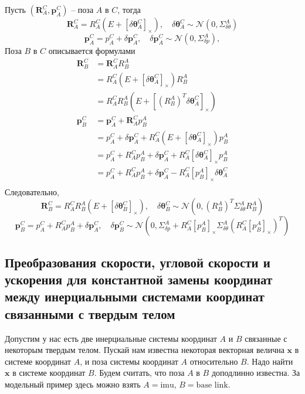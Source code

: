 \documentclass[12pt]{article}
\begin{document}
Пусть $(\pmb{R}_A^C, \pmb{p}_A^C)$ -- поза $A$ в $C$, тогда
$$
    \pmb{R}_A^C=R_A^C(E+[\delta\pmb{\theta}_A^C]_\times),
    \quad
    \delta\pmb{\theta}_A^C \sim\mathcal{N}(0, \Sigma_{\delta\theta}^A)
$$
$$
    \pmb{p}_A^C=p_A^C+\delta \pmb{p}_A^C,
    \quad
    \delta\pmb{p}_A^C\sim\mathcal{N}(0, \Sigma_{\delta p}^A),
$$
Поза $B$ в $C$ описывается формулами
$$
    \begin{aligned}
        \pmb{R}_B^C
         & =\pmb{R}_A^C R_B^A                                              \\
         & =R_A^C(E+[\delta\pmb{\theta}_A^C]_\times) R_B^A                 \\
         & =R_A^C R_B^A(E+[(R_B^A)^T\delta\pmb{\theta}_A^C]_\times)        \\
        \pmb{p}_B^C
         & =\pmb{p}_A^C + \pmb{R}_A^C p_B^A                                \\
         & =p_A^C + \delta \pmb{p}_A^C
        + R_A^C(E+[\delta\pmb{\theta}_A^C]_\times) p_B^A                   \\
         & =p_A^C + R_A^C p_B^A
        + \delta \pmb{p}_A^C + R_A^C [\delta\pmb{\theta}_A^C]_\times p_B^A \\
         & =p_A^C + R_A^C p_B^A
        + \delta \pmb{p}_A^C - R_A^C [p_B^A]_\times \delta\pmb{\theta}_A^C \\
    \end{aligned}
$$
Следовательно,
\begin{equation}
    \pmb{R}_B^C=R_A^CR_B^A(E+[\delta\pmb{\theta}_B^C]_\times),
    \quad
    \delta\pmb{\theta}_B^C \sim\mathcal{N}(0, (R_B^A)^T\Sigma_{\delta\theta}^A R_B^A)
\end{equation}
\begin{equation}
    \pmb{p}_B^C=p_A^C + R_A^C p_B^A+\delta \pmb{p}_A^C,
    \quad
    \delta\pmb{p}_B^C\sim\mathcal{N}(
    0,
    \Sigma_{\delta p}^A
    +R_A^C [p_B^A]_\times \Sigma_{\delta\theta}^A (R_A^C [p_B^A]_\times)^T
    )
\end{equation}


\subsection{Преобразования скорости, угловой скорости и ускорения для
    константной замены координат между инерциальными
    системами координат связанными с твердым телом
}

Допустим у нас есть две инерциальные системы координат $A$ и $B$ связанные с
некоторым твердым телом. Пускай нам известна некоторая векторная
велична $\pmb{x}$ в системе координат $A$, и поза системы координат $A$
относительно $B$. Надо найти $\pmb{x}$ в системе координат $B$. Будем считать,
что поза $A$ в $B$ доподлинно известна. За модельный пример здесь можно
взять $A=\mbox{imu}$, $B=\mbox{base link}$.
\end{document}
